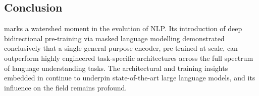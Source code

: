 \subsection{Conclusion}
\label{subsec:conclusion}

\bert{} marks a watershed moment in the evolution of NLP.  Its introduction of
deep bidirectional pre-training via masked language modelling demonstrated
conclusively that a single general-purpose encoder, pre-trained at scale, can
outperform highly engineered task-specific architectures across the full spectrum
of language understanding tasks.  The architectural and training insights embedded
in \bert{} continue to underpin state-of-the-art large language models, and its
influence on the field remains profound.
